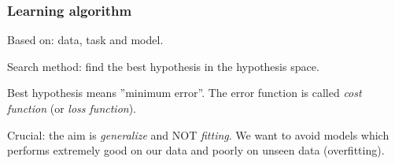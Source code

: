 \documentclass{beamer}
\begin{document}
	\begin{frame}
		\frametitle{Learning algorithm}
		Based on: data, task and model.
		
		\vspace{5mm}
		
		Search method: find the best hypothesis in the hypothesis space.
		
		\vspace{5mm}
		
		Best hypothesis means ''minimum error''. The error function is called \textsl{cost function} (or \textsl{loss function}).
		
		\vspace{5mm}
		
		Crucial: the aim is \textsl{generalize} and NOT \textsl{fitting}. We want to avoid models which performs extremely good on our data and poorly on unseen data (overfitting).
	\end{frame}

	
	
\end{document}
